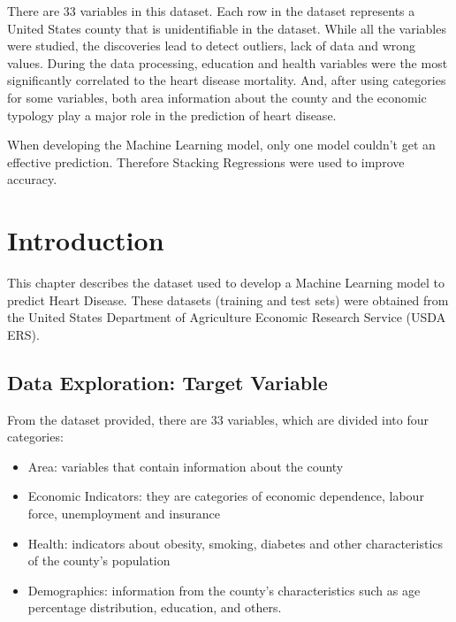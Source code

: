 \documentclass[
10pt, %
a4paper, %
oneside, %
headinclude,footinclude, %
BCOR5mm, %
]{scrartcl}
\begin{document}
There are 33 variables in this dataset. Each row in the dataset represents a United States county that is unidentifiable in the dataset. While all the variables were studied, the discoveries lead to detect outliers, lack of data and wrong values. During the data processing, education and health variables were the most significantly correlated to the heart disease mortality. And, after using categories for some variables, both area information about the county and the economic typology play a major role in the prediction of heart disease.

When developing the Machine Learning model, only one model couldn't get an effective prediction. Therefore Stacking Regressions were used to improve accuracy.


\let\thefootnote\relax{}




\section{Introduction}

This chapter describes the dataset used to develop a Machine Learning model to predict Heart Disease. These datasets (training and test sets) were obtained from the United States Department of Agriculture Economic Research Service (USDA ERS).

\subsection{Data Exploration: Target Variable}

From the dataset provided, there are 33 variables, which are divided into four categories:
\begin{itemize}
    \item Area: variables that contain information about the county
    \item Economic Indicators: they are categories of economic dependence, labour force, unemployment and insurance
    \item Health: indicators about obesity, smoking, diabetes and other characteristics of the county's population
    \item Demographics: information from the county's characteristics such as age percentage distribution, education, and others.
\end{itemize}
\end{document}
